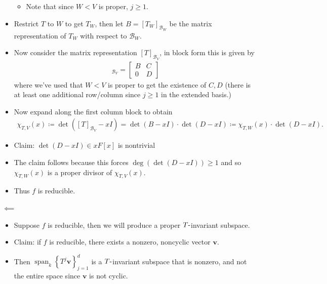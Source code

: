 \begin{solution}
\begin{itemize}
  \begin{itemize}
  \tightlist
  \item
    Note that since \(W<V\) is proper, \(j\geq 1\).
  \end{itemize}
\item
  Restrict \(T\) to \(W\) to get \(T_W\), then let
  \(B = [T_W]_{{\mathcal{B}}_W}\) be the matrix representation of
  \(T_W\) with respect to \({\mathcal{B}}_W\).
\item
  Now consider the matrix representation \([T]_{{\mathcal{B}}_V}\), in
  block form this is given by
  \begin{align*}
  [T]_{{\mathcal{B}}_V} = 
  \begin{bmatrix}
  B & C \\
  0 & D
  \end{bmatrix}
  \end{align*}
  where we've used that \(W<V\) is proper to get the existence of
  \(C, D\) (there is at least one additional row/column since
  \(j\geq 1\) in the extended basis.) 
\item
  Now expand along the first column block to obtain
  \begin{align*}
  \chi_{T, V}(x) \coloneqq\det([T]_{{\mathcal{B}}_V} - xI) = \det(B - xI)\cdot \det(D - xI) \coloneqq\chi_{T, W}(x) \cdot \det(D-xI)
  .\end{align*}
\item
  Claim: \(\det(D - xI) \in xF[x]\) is nontrivial
\item
  The claim follows because this forces \(\deg(\det(D-xI)) \geq 1\) and
  so \(\chi_{T, W}(x)\) is a proper divisor of \(\chi_{T, V}(x)\).
\item
  Thus \(f\) is reducible.
\end{itemize}

\(\impliedby\)

\begin{itemize}
\tightlist
\item
  Suppose \(f\) is reducible, then we will produce a proper
  \(T{\hbox{-}}\)invariant subspace.
\item
  Claim: if \(f\) is reducible, there exists a nonzero, noncyclic vector
  \(\mathbf{v}\).
\item
  Then \({\operatorname{span}}_k\left\{{T^j\mathbf{v}}\right\}_{j=1}^d\)
  is a \(T{\hbox{-}}\)invariant subspace that is nonzero, and not the
  entire space since \(\mathbf{v}\) is not cyclic.
\end{itemize}


\end{solution}
